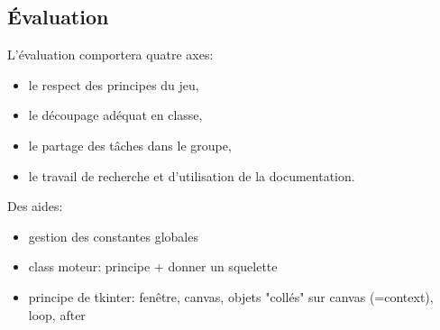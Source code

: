 \documentclass[a4paper,11pt]{article}
\begin{document}
\begin{Form}
\section{Évaluation}
L'évaluation comportera quatre axes:
\begin{itemize}
\item le respect des principes du jeu,
\item le découpage adéquat en classe,
\item le partage des tâches dans le groupe,
\item le travail de recherche et d'utilisation de la documentation.
\end{itemize}
\begin{commentprof}
Des aides:
\begin{itemize}
\item gestion des constantes globales
\item class moteur: principe + donner un squelette
\item principe de tkinter: fenêtre, canvas, objets "collés" sur canvas (=context), loop, after
\end{itemize}
\end{commentprof}
\end{Form}
\end{document}
